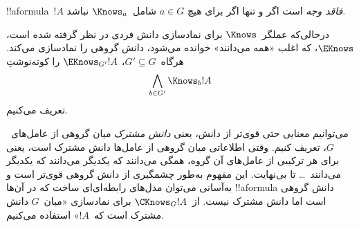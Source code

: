 \documentclass[../../../include/open-logic-section]{subfiles}
\begin{document}
!!a{formula}~$!A$ \emph{فاقد وجه} است اگر و تنها اگر برای هیچ
$a \in G$ شامل~$\Knows_a$ نباشد.

\begin{defn}
  درحالی‌که عملگر~$\Knows$ برای نمادسازی دانش فردی در نظر گرفته شده
  است، $\EKnows$، که اغلب «همه می‌دانند» خوانده می‌شود، دانش گروهی را
  نمادسازی می‌کند. هرگاه~$G' \subseteq G$، $\EKnows_{G'} !A$ را
  کوته‌نوشتِ~\[\bigwedge_{b \in G'} \Knows_b !A\] تعریف می‌کنیم.
\end{defn}

می‌توانیم معنایی حتی قوی‌تر از دانش، یعنی \emph{دانش مشترک} میان گروهی
از عامل‌های~$G$، تعریف کنیم. وقتی اطلاعاتی میان گروهی از عامل‌ها دانش
مشترک است، یعنی برای هر ترکیبی از عامل‌های آن گروه، همگی می‌دانند که
یکدیگر می‌دانند که یکدیگر می‌دانند~\dots{} تا بی‌نهایت. این مفهوم
به‌طور چشمگیری از دانش گروهی قوی‌تر است و به‌آسانی می‌توان مدل‌های
رابطه‌ای‌ای ساخت که در آن‌ها !!a{formula} دانش گروهی است اما دانش
مشترک نیست. از~$\CKnows_G !A$ برای نمادسازی «میان~$G$ دانش مشترک است
که~$!A$» استفاده می‌کنیم.
\end{document}

